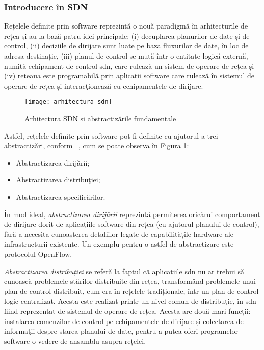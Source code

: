 \subsubsection{Introducere în SDN}

Rețelele definite prin software reprezintă o nouă paradigmă în arhitecturile de rețea și au la bază patru idei principale: (i) decuplarea planurilor de date și de control, (ii) deciziile de dirijare sunt luate pe baza fluxurilor de date, în loc de adresa destinație, (iii) planul de control se mută într-o entitate logică externă, numită echipament de control \gls{sdn}, care rulează un sistem de operare de rețea și (iv) rețeaua este programabilă prin aplicații software care rulează în sistemul de operare de rețea și interacţionează cu echipamentele de dirijare.

\begin{figure}[h]
	\centering
	\texttt{[image: arhitectura\_sdn]}
	\caption{Arhitectura SDN și abstractizările fundamentale~\cite{kreutz2015software}}
	\label{fig:arhitectura_sdn}
\end{figure}

Astfel, rețelele definite prin software pot fi definite cu ajutorul a trei abstractizări, conform ~\cite{kreutz2015software}, cum se poate observa în Figura \ref{fig:arhitectura_sdn}:
\begin{itemize}
	\item Abstractizarea dirijării;
	\item Abstractizarea distribuţiei;
	\item Abstractizarea specificărilor.	 
\end{itemize}

În mod ideal, \textit{abstractizarea dirijării} reprezintă permiterea oricărui comportament de dirijare dorit de aplicațiile software din rețea (cu ajutorul planului de control),  fără a necesita cunoașterea detaliilor legate de capabilitățile hardware ale infrastructurii existente. Un exemplu pentru o astfel de abstractizare este protocolul OpenFlow.

\textit{Abstractizarea distribuției} se referă la faptul că aplicațiile \gls{sdn} nu ar trebui să cunoască problemele stărilor distribuite din rețea, transformând problemele unui plan de control distribuit, cum era în rețelele tradiționale, într-un plan de control logic centralizat. Acesta este realizat printr-un nivel comun de distribuţie, în \gls{sdn} fiind reprezentat de sistemul de operare de rețea. Acesta are două mari funcții: instalarea comenzilor de control pe echipamentele de dirijare și colectarea de informaţii despre starea planului de date, pentru a putea oferi programelor software o vedere de ansamblu asupra rețelei.

